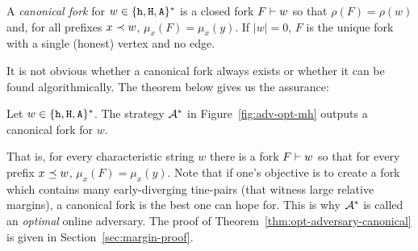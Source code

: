 \begin{definition}
  A \emph{canonical fork} for $w \in \{\mathtt{h}, \mathtt{H}, \mathtt{A}\}^*$ 
  is a closed fork $F \vdash w$ so that 
  $\rho(F) = \rho(w)$ 
  and, for all prefixes $x \prec w$, $\mu_x(F) = \mu_x(y)$. 
  If $|w| = 0$, $F$ is 
  the unique fork with a single (honest) vertex and no edge. 
\end{definition}

It is not obvious whether a canonical fork always exists 
or whether it can be found algorithmically. 
The theorem below gives us the assurance:


\begin{theorem}\label{thm:opt-adversary-canonical}
  Let $w \in \{\mathtt{h}, \mathtt{H}, \mathtt{A}\}^*$. 
  The strategy $\mathcal{A}^*$ in Figure~\ref{fig:adv-opt-mh}
  outputs a canonical fork for $w$.  
\end{theorem}
That is, for every characteristic string $w$ 
there is a fork $F \vdash w$ so that 
for every prefix $x \preceq w$, $\mu_x(F) = \mu_x(y)$. 
Note that if one's objective is to create a fork 
which contains many early-diverging tine-pairs (that witness large relative margins), 
a canonical fork is the best one can hope for. 
This is why $\mathcal{A}^*$ is called an \emph{optimal} online adversary. 
The proof of Theorem~\ref{thm:opt-adversary-canonical} 
is given in Section~\ref{sec:margin-proof}.






